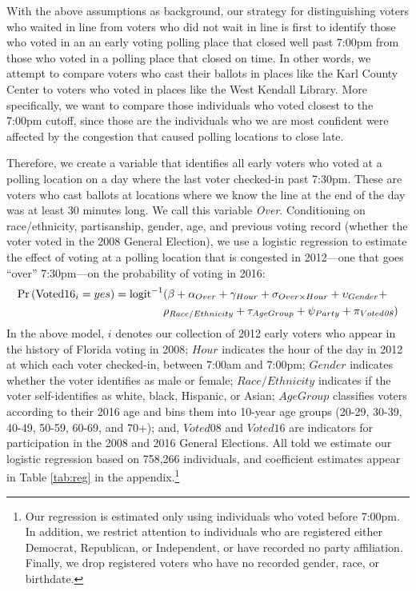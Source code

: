 \documentclass[12pt,titlepage]{article}
\begin{document}
With the above assumptions as background, our strategy for
distinguishing voters who waited in line from voters who did not wait
in line is first to identify those who voted in an an early voting
polling place that closed well past 7:00pm from those who voted in a
polling place that closed on time.  In other words, we attempt to
compare voters who cast their ballots in places like the Karl County
Center to voters who voted in places like the West Kendall Library.
More specifically, we want to compare those individuals who voted
closest to the 7:00pm cutoff, since those are the individuals who we
are most confident were affected by the congestion that caused polling
locations to close late.
 
Therefore, we create a variable that identifies all early voters who
voted at a polling location on a day where the last voter checked-in
past 7:30pm.  These are voters who cast ballots at locations where we
know the line at the end of the day was at least 30 minutes long.  We
call this variable \emph{Over}.  Conditioning on race/ethnicity,
partisanship, gender, age, and previous voting record (whether the
voter voted in the 2008 General Election), we use a logistic
regression to estimate the effect of voting at a polling location that
is congested in 2012---one that goes ``over'' 7:30pm---on the
probability of voting in 2016:
\begin{equation*}
  \begin{aligned}
    \textup{Pr}\left(\mathrm{Voted16}_{i} = yes\right) =  \textup{logit}^{-1}&(\beta + \alpha_{Over} + \gamma_{Hour} +
    \sigma_{Over \times Hour} + \upsilon_{Gender}  + \\& \rho_{Race/Ethnicity} +
      \tau_{Age Group} + \psi_{Party} + \pi_{Voted\emph{08}})
  \end{aligned}
\end{equation*}
%
In the above model, $i$ denotes our collection of 2012 early voters
who appear in the history of Florida voting in 2008; $Hour$ indicates
the hour of the day in 2012 at which each voter checked-in, between
7:00am and 7:00pm; $Gender$ indicates whether the voter identifies as
male or female; $Race/Ethnicity$ indicates if the voter
self-identifies as white, black, Hispanic, or Asian; $AgeGroup$
classifies voters according to their 2016 age and bins them into
10-year age groups (20-29, 30-39, 40-49, 50-59, 60-69, and 70+); and,
$Voted08$ and $Voted16$ are indicators for participation in the 2008
and 2016 General Elections.  All told we estimate our logistic
regression based on 758,266 individuals, and coefficient estimates
appear in Table \ref{tab:reg} in the appendix.\footnote{Our regression
  is estimated only using individuals who voted before 7:00pm.  In
  addition, we restrict attention to individuals who are registered
  either Democrat, Republican, or Independent, or have recorded no
  party affiliation.  Finally, we drop registered voters who have no
  recorded gender, race, or birthdate.}
\end{document}
